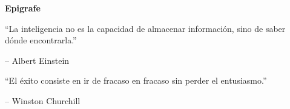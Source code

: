 
\vspace*{2cm}

{\Huge \textbf{Epigrafe}} \\[1.0cm]
 


\epigraph{
    ``La inteligencia no es la capacidad de almacenar información, sino de saber dónde encontrarla.''
}{
    -- Albert Einstein
}

\vspace{2cm} %
\epigraph{
    ``El éxito consiste en ir de fracaso en fracaso sin perder el entusiasmo.''
}{
    -- Winston Churchill
}

\clearpage